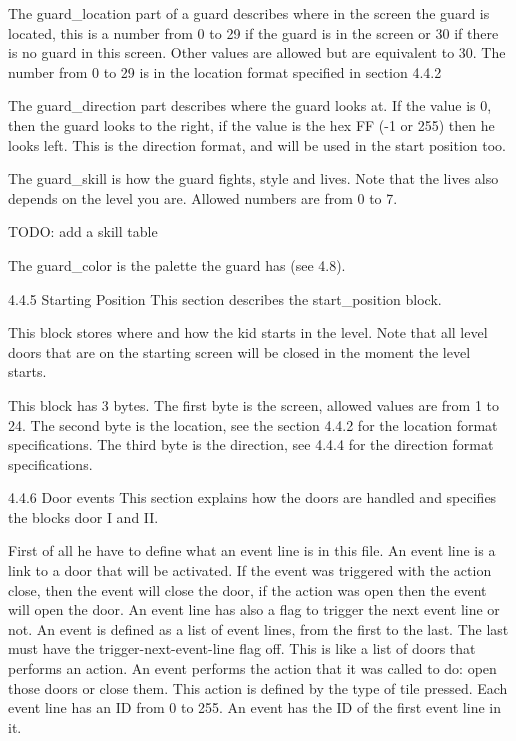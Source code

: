  The guard_location part of a guard describes where in the screen the guard
 is located, this is a number from 0 to 29 if the guard is in the screen or
 30 if there is no guard in this screen. Other values are allowed but are
 equivalent to 30. The number from 0 to 29 is in the location format
 specified in section 4.4.2
 
 The guard_direction part describes where the guard looks at. If the value
 is 0, then the guard looks to the right, if the value is the hex FF (-1 or
 255) then he looks left. This is the direction format, and will be used in
 the start position too.

 The guard_skill is how the guard fights, style and lives. Note that the
 lives also depends on the level you are. Allowed numbers are from 0 to 7.

 TODO: add a skill table

 The guard_color is the palette the guard has (see 4.8).

4.4.5 Starting Position
 This section describes the start_position block.
 
 This block stores where and how the kid starts in the level. Note that all
 level doors that are on the starting screen will be closed in the moment
 the level starts.
 
 This block has 3 bytes.
 The first byte is the screen, allowed values are from 1 to 24.
 The second byte is the location, see the section 4.4.2 for the location
 format specifications.
 The third byte is the direction, see 4.4.4 for the direction format
 specifications.

4.4.6 Door events 
 This section explains how the doors are handled and specifies the blocks
 door I and II.

 First of all he have to define what an event line is in this file. An event
 line is a link to a door that will be activated. If the event was triggered
 with the action close, then the event will close the door, if the action
 was open then the event will open the door. An event line has also a flag
 to trigger the next event line or not.
 An event is defined as a list of event lines, from the first to the last.
 The last must have the trigger-next-event-line flag off. This is like a
 list of doors that performs an action.
 An event performs the action that it was called to do: open those doors or
 close them. This action is defined by the type of tile pressed.
 Each event line has an ID from 0 to 255. An event has the ID of the first
 event line in it.

